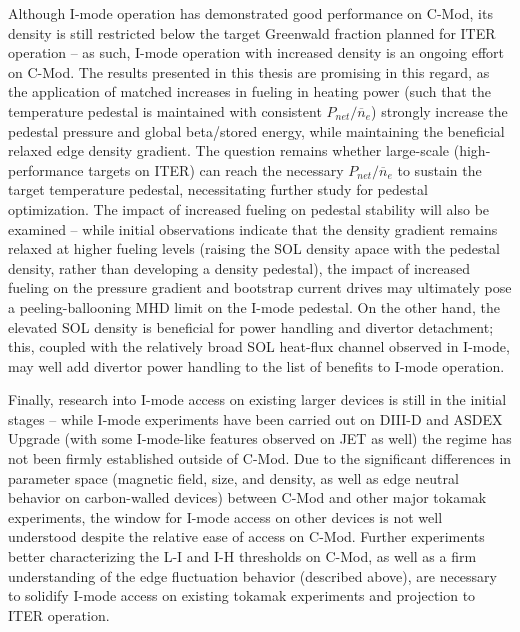Although I-mode operation has demonstrated good performance on C-Mod, its density is still restricted below the target Greenwald fraction planned for ITER operation -- as such, I-mode operation with increased density is an ongoing effort on C-Mod.  The results presented in this thesis are promising in this regard, as the application of matched increases in fueling in heating power (such that the temperature pedestal is maintained with consistent $P_{net}/\overline{n}_e$) strongly increase the pedestal pressure and global beta/stored energy, while maintaining the beneficial relaxed edge density gradient.  The question remains whether large-scale (\eg high-performance targets on ITER) can reach the necessary $P_{net}/\overline{n}_e$ to sustain the target temperature pedestal, necessitating further study for pedestal optimization.  The impact of increased fueling on pedestal stability will also be examined -- while initial observations indicate that the density gradient remains relaxed at higher fueling levels (raising the SOL density apace with the pedestal density, rather than developing a density pedestal), the impact of increased fueling on the pressure gradient and bootstrap current drives may ultimately pose a peeling-ballooning MHD limit on the I-mode pedestal.  On the other hand, the elevated SOL density is beneficial for power handling and divertor detachment; this, coupled with the relatively broad SOL heat-flux channel observed in I-mode, may well add divertor power handling to the list of benefits to I-mode operation.

Finally, research into I-mode access on existing larger devices is still in the initial stages -- while I-mode experiments have been carried out on DIII-D and ASDEX Upgrade (with some I-mode-like features observed on JET as well) the regime has not been firmly established outside of C-Mod.  Due to the significant differences in parameter space (magnetic field, size, and density, as well as edge neutral behavior on carbon-walled devices) between C-Mod and other major tokamak experiments, the window for I-mode access on other devices is not well understood despite the relative ease of access on C-Mod.  Further experiments better characterizing the L-I and I-H thresholds on C-Mod, as well as a firm understanding of the edge fluctuation behavior (described above), are necessary to solidify I-mode access on existing tokamak experiments and projection to ITER operation.\nicechapterending


